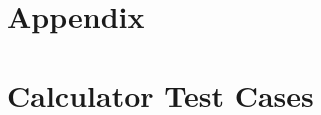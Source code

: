 \documentclass[letterpaper]{article}
\begin{document}
\section*{Appendix}
\appendix
\section{Calculator Test Cases}

\end{document}
